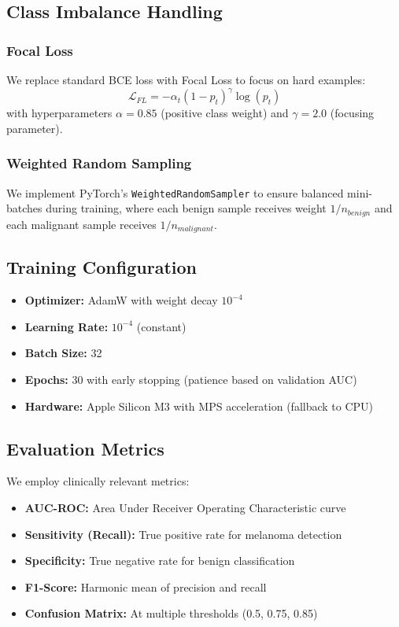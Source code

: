 \documentclass[12pt,a4paper]{article}
\begin{document}
\subsection{Class Imbalance Handling}

\subsubsection{Focal Loss}
We replace standard BCE loss with Focal Loss to focus on hard examples:
\begin{equation}
    \mathcal{L}_{FL} = -\alpha_t (1 - p_t)^\gamma \log(p_t)
\end{equation}
with hyperparameters $\alpha=0.85$ (positive class weight) and $\gamma=2.0$ (focusing parameter).

\subsubsection{Weighted Random Sampling}
We implement PyTorch's \texttt{WeightedRandomSampler} to ensure balanced mini-batches during training, where each benign sample receives weight $1/n_{benign}$ and each malignant sample receives $1/n_{malignant}$.

\subsection{Training Configuration}

\begin{itemize}
    \item \textbf{Optimizer:} AdamW with weight decay $10^{-4}$
    \item \textbf{Learning Rate:} $10^{-4}$ (constant)
    \item \textbf{Batch Size:} 32
    \item \textbf{Epochs:} 30 with early stopping (patience based on validation AUC)
    \item \textbf{Hardware:} Apple Silicon M3 with MPS acceleration (fallback to CPU)
\end{itemize}

\subsection{Evaluation Metrics}

We employ clinically relevant metrics:
\begin{itemize}
    \item \textbf{AUC-ROC:} Area Under Receiver Operating Characteristic curve
    \item \textbf{Sensitivity (Recall):} True positive rate for melanoma detection
    \item \textbf{Specificity:} True negative rate for benign classification
    \item \textbf{F1-Score:} Harmonic mean of precision and recall
    \item \textbf{Confusion Matrix:} At multiple thresholds (0.5, 0.75, 0.85)
\end{itemize}
\end{document}

